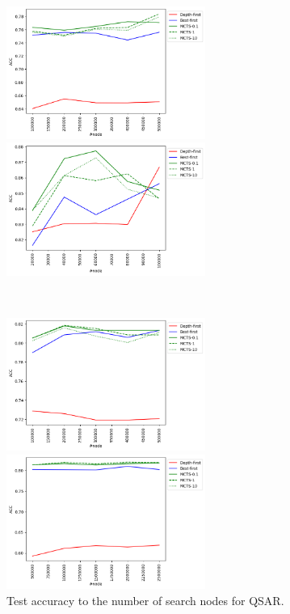 \begin{figure}[htbp]
 \begin{minipage}{0.5\hsize}
  \begin{center}
   \includegraphics[width=65mm]{img/cpdb/grid/acc_node.png}
  \end{center}
 \end{minipage}
 \begin{minipage}{0.5\hsize}
  \begin{center}
   \includegraphics[width=65mm]{img/mutag/grid/acc_node.png}
  \end{center}
 \end{minipage}\\
 \begin{minipage}{0.5\hsize}
  \begin{center}
   \includegraphics[width=65mm]{img/aids/grid/acc_node.png}
  \end{center}
 \end{minipage}
 \begin{minipage}{0.5\hsize}
  \begin{center}
   \includegraphics[width=65mm]{img/cas/grid/acc_node.png}
  \end{center}
 \end{minipage}
 \caption{Test accuracy to the number of search nodes for QSAR.}
  \label{fig:acc_node}
\end{figure}

